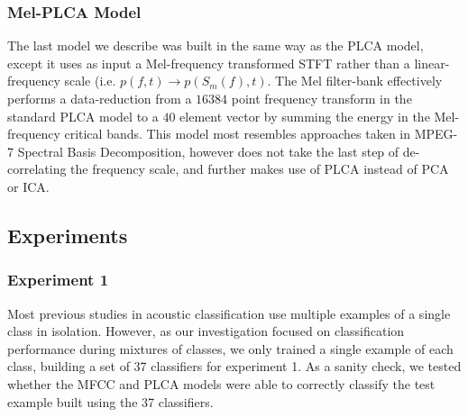 

\subsubsection{Mel-PLCA Model}

The last model we describe was built in the same way as the PLCA model, except it uses as input a Mel-frequency transformed STFT rather than a linear-frequency scale (i.e. $p(f,t) \rightarrow p(S_m(f),t)$.  The Mel filter-bank effectively performs a data-reduction from a $16384$ point frequency transform in the standard PLCA model to a $40$ element vector by summing the energy in the Mel-frequency critical bands.  This model most resembles approaches taken in MPEG-7 Spectral Basis Decomposition, however does not take the last step of de-correlating the frequency scale, and further makes use of PLCA instead of PCA or ICA.  %

\subsection{Experiments}
\subsubsection{Experiment 1}
Most previous studies in acoustic classification use multiple examples of a single class in isolation.  However, as our investigation focused on classification performance during mixtures of classes, we only trained a single example of each class, building a set of 37 classifiers for experiment 1.  As a sanity check, we tested whether the MFCC and PLCA models were able to correctly classify the test example built using the 37 classifiers.

